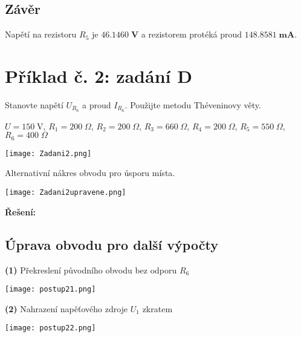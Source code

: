 \documentclass[a4paper,12pt]{article}
\begin{document}
\subsection{Závěr}
Napětí na rezistoru $R_5$ je $\mathbf{46.1460 \;\si{\volt}}$  a rezistorem protéká proud $\mathbf{148.8581 \;\si{\milli\ampere}}$.\newpage
\section{Příklad č. 2: zadání D}
Stanovte napětí $U_{R_6}$ a proud $I_{R_6}$. Použijte metodu Théveninovy věty.\par\vspace{1.5em}
$U=150\;\si{\volt}$, $R_1=200\;\si{\Omega}$, $R_2=200\;\si{\Omega}$, $R_3=660\;\si{\Omega}$, $R_4=200\;\si{\Omega}$, $R_5=550\;\si{\Omega}$, $R_6=400\;\si{\Omega}$\vspace{1.5em}
\begin{center}
\texttt{[image: Zadani2.png]}
\end{center}\par\vspace{1em}
Alternativní nákres obvodu pro úsporu místa.\par
\begin{center}
\texttt{[image: Zadani2upravene.png]}
\end{center}\par
\newpage
\textbf{\large Řešení:}
\vspace{-1,2em}
\subsection{Úprava obvodu pro další výpočty}
\hspace{1em}\textbf{(1)} Překreslení původního obvodu bez odporu $R_6$\par\vspace{0.7em}
\texttt{[image: postup21.png]}\par\vspace{1.7em}
\hspace{1em}\textbf{(2)} Nahrazení napěťového zdroje $U_1$ zkratem\par\vspace{0.7em}
\hspace{2em}\texttt{[image: postup22.png]}\par\vspace{0.4em}
\end{document}
